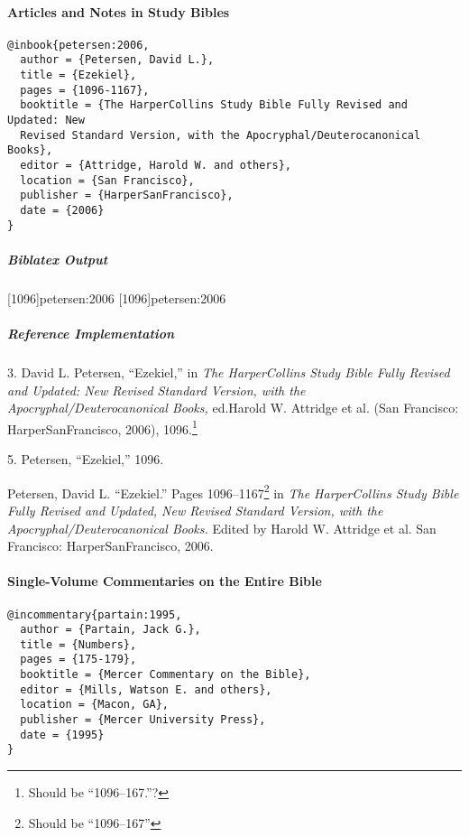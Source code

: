 \documentclass[a4paper]{article}
\newenvironment{biboutput}{%
  \subparagraph{Biblatex Output}
}{\color{black}}
\newenvironment{refimp}{%
  \subparagraph{Reference Implementation}
  \color{reference-colour}
  \rm
}{\par\color{black}}
\begin{document}
\paragraph{Articles and Notes in Study Bibles}

\begin{lstlisting}
@inbook{petersen:2006,
  author = {Petersen, David L.},
  title = {Ezekiel},
  pages = {1096-1167},
  booktitle = {The HarperCollins Study Bible Fully Revised and Updated: New
  Revised Standard Version, with the Apocryphal/Deuterocanonical Books},
  editor = {Attridge, Harold W. and others},
  location = {San Francisco},
  publisher = {HarperSanFrancisco},
  date = {2006}
}
\end{lstlisting}

\begin{biboutput}
  [1096]{petersen:2006}
  [1096]{petersen:2006}
\end{biboutput}

\begin{refimp}
  \hspace*{\bibindent}3. David L. Petersen, “Ezekiel,” in \emph{The
  HarperCollins Study Bible Fully Revised and Updated: New Revised Standard
  Version, with the Apocryphal\slash Deuterocanonical Books,} ed.\@ Harold W.
  Attridge et al. (San Francisco: HarperSanFrancisco, 2006),
  1096.\footnote{Should be “1096–167.”?}

  \hspace*{\bibindent}5. Petersen, “Ezekiel,” 1096.

  \hangindent\bibindent Petersen, David L. “Ezekiel.” Pages
  1096–1167\footnote{Should be “1096–167”} in \emph{The HarperCollins Study
  Bible Fully Revised and Updated, New Revised Standard Version, with the
  Apocryphal/Deuterocanonical Books.} Edited by Harold W. Attridge et al. San
  Francisco: HarperSanFrancisco, 2006.
\end{refimp}

\paragraph{Single-Volume Commentaries on the Entire Bible}

\begin{lstlisting}
@incommentary{partain:1995,
  author = {Partain, Jack G.},
  title = {Numbers},
  pages = {175-179},
  booktitle = {Mercer Commentary on the Bible},
  editor = {Mills, Watson E. and others},
  location = {Macon, GA},
  publisher = {Mercer University Press},
  date = {1995}
}
\end{lstlisting}
\end{document}
